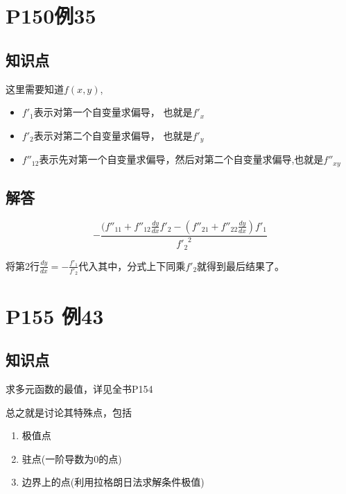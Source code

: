 \documentclass[a4paper]{ctexart}
\begin{document}
\begin{multicols}{2}
\section{P150例35}
\subsection{知识点}
\par 这里需要知道$f(x,y)$, 
\begin{itemize}
    \item $f'_1$表示对第一个自变量求偏导， 也就是$f'_x$
    \item $f'_2$表示对第二个自变量求偏导， 也就是$f'_y$
    \item $f''_{12}$表示先对第一个自变量求偏导，然后对第二个自变量求偏导,也就是$f''_{xy}$
\end{itemize}

\subsection{解答}
\begin{equation}
- \frac{
    (f''_{11} + f''_{12}\frac{dy}{dx}f'_2   - (f''_{21} + f''_{22}\frac{dy}{dx})f'_1 
}
    {
        {f'_2}^2
}
\end{equation}
\par 将第2行$\frac{dy}{dx} = - \frac{f'_1}{f'_2}$代入其中，分式上下同乘$f'_2$就得到最后结果了。


\section{P155 例43}
\subsection{知识点}
\par 求多元函数的最值，详见全书P154
\par 总之就是讨论其特殊点，包括
\begin{enumerate}
    \item 极值点
    \item 驻点(一阶导数为0的点)
    \item 边界上的点(利用拉格朗日法求解条件极值)
\end{enumerate}


\end{multicols}
\end{document}

